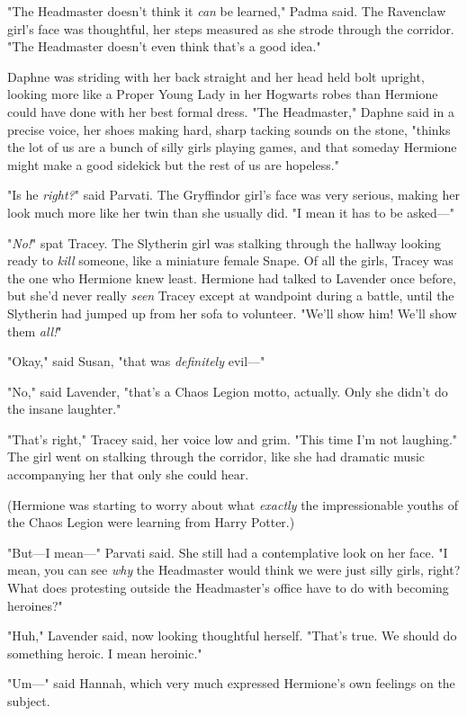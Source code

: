 "The Headmaster doesn't think it \emph{can} be learned," Padma said. The
Ravenclaw girl's face was thoughtful, her steps measured as she strode through
the corridor. "The Headmaster doesn't even think that's a good idea."

Daphne was striding with her back straight and her head held bolt upright,
looking more like a Proper Young Lady in her Hogwarts robes than Hermione could
have done with her best formal dress. "The Headmaster," Daphne said in a
precise voice, her shoes making hard, sharp tacking sounds on the stone,
"thinks the lot of us are a bunch of silly girls playing games, and that
someday Hermione might make a good sidekick but the rest of us are hopeless."

"Is he \emph{right?}" said Parvati. The Gryffindor girl's face was very
serious, making her look much more like her twin than she usually did. "I mean
it has to be asked---"

"\emph{No!}" spat Tracey. The Slytherin girl was stalking through the hallway
looking ready to \emph{kill} someone, like a miniature female Snape. Of all the
girls, Tracey was the one who Hermione knew least. Hermione had talked to
Lavender once before, but she'd never really \emph{seen} Tracey except at
wandpoint during a battle, until the Slytherin had jumped up from her sofa to
volunteer. "We'll show him! We'll show them \emph{all!}"

"Okay," said Susan, "that was \emph{definitely} evil---"

"No," said Lavender, "that's a Chaos Legion motto, actually. Only she didn't do
the insane laughter."

"That's right," Tracey said, her voice low and grim. "This time I'm not
laughing." The girl went on stalking through the corridor, like she had
dramatic music accompanying her that only she could hear.

(Hermione was starting to worry about what \emph{exactly} the impressionable
youths of the Chaos Legion were learning from Harry Potter.)

"But---I mean---" Parvati said. She still had a contemplative look on her face.
"I mean, you can see \emph{why} the Headmaster would think we were just silly
girls, right? What does protesting outside the Headmaster's office have to do
with becoming heroines?"

"Huh," Lavender said, now looking thoughtful herself. "That's true. We should
do something heroic. I mean heroinic."

"Um---" said Hannah, which very much expressed Hermione's own feelings on the
subject.

